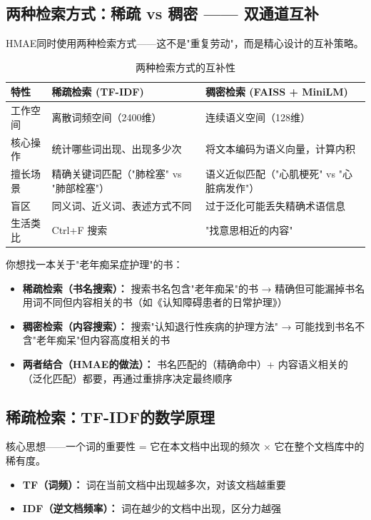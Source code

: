 \documentclass[11pt,a4paper]{ctexart}
\begin{document}
\subsection{两种检索方式：稀疏 vs 稠密 —— 双通道互补}

HMAE同时使用两种检索方式——这不是"重复劳动"，而是精心设计的互补策略。

\begin{table}[H]
\centering
\small
\begin{tabular}{p{2.5cm}p{5.5cm}p{5.5cm}}
\toprule
\textbf{特性} & \textbf{稀疏检索 (TF-IDF)} & \textbf{稠密检索 (FAISS + MiniLM)} \\
\midrule
工作空间 & 离散词频空间（2400维） & 连续语义空间（128维） \\
核心操作 & 统计哪些词出现、出现多少次 & 将文本编码为语义向量，计算内积 \\
擅长场景 & 精确关键词匹配（"肺栓塞" vs "肺部栓塞"） & 语义近似匹配（"心肌梗死" vs "心脏病发作"） \\
盲区 & 同义词、近义词、表述方式不同 & 过于泛化可能丢失精确术语信息 \\
生活类比 & Ctrl+F 搜索 & "找意思相近的内容" \\
\bottomrule
\end{tabular}
\caption{两种检索方式的互补性}
\end{table}

\begin{exambox}
你想找一本关于"老年痴呆症护理"的书：
\begin{itemize}[nosep]
\item \textbf{稀疏检索（书名搜索）：} 搜索书名包含"老年痴呆"的书 → 精确但可能漏掉书名用词不同但内容相关的书（如《认知障碍患者的日常护理》）
\item \textbf{稠密检索（内容搜索）：} 搜索"认知退行性疾病的护理方法" → 可能找到书名不含"老年痴呆"但内容高度相关的书
\item \textbf{两者结合（HMAE的做法）：} 书名匹配的（精确命中）+ 内容语义相关的（泛化匹配）都要，再通过重排序决定最终顺序
\end{itemize}
\end{exambox}

\subsection{稀疏检索：TF-IDF的数学原理}

\begin{defbox}
核心思想——一个词的重要性 = 它在本文档中出现的频次 × 它在整个文档库中的稀有度。
\begin{itemize}[nosep]
\item \textbf{TF（词频）：} 词在当前文档中出现越多次，对该文档越重要
\item \textbf{IDF（逆文档频率）：} 词在越少的文档中出现，区分力越强
\end{itemize}
\end{defbox}
\end{document}

